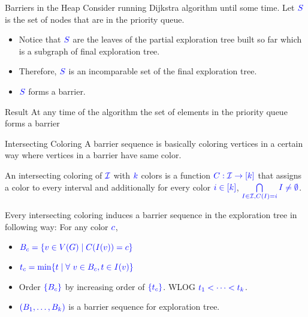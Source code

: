 \documentclass[10pt]{beamer}
\begin{document}
\begin{frame}{Barriers in the Heap}
	Consider running Dijkstra algorithm until some time. Let $\mathcolor{blue}{S}$ is the set of nodes that are in the priority queue.\pause
	\begin{itemize}
		\item Notice that $\mathcolor{blue}{S}$ are the leaves of the partial exploration tree built so far which is a subgraph of final exploration tree.\pause
		\item Therefore, $\mathcolor{blue}{S}$ is an incomparable set of the final exploration tree.
		\item $\mathcolor{blue}{S}$ forms a barrier.
	\end{itemize}\pause \vfill

	\begin{alertblock}{Result}
		At any time of the algorithm the set of elements in the priority queue forms a barrier
	\end{alertblock}
\end{frame}
\begin{frame}{Intersecting Coloring}
	A barrier sequence is basically coloring vertices in a certain way where vertices in a barrier have same color.\pause
	\begin{definition}
		An intersecting coloring of $\mathcolor{blue}{\mathcal{I}}$ with $\mathcolor{blue}{k}$ colors is a function $\mathcolor{blue}{C:\mathcal{I}\to [k]}$ that assigns a color to every interval and additionally for every color $\mathcolor{blue}{i\in[k]}$, $\mathcolor{blue}{\bigcap\limits_{I\in\mathcal{I}, C(I)=i}I\neq \emptyset}$.
	\end{definition}\pause \vfill

	Every intersecting coloring induces a barrier sequence in the exploration tree in following way: For any color $\mathcolor{blue}{c}$,\pause
	\begin{itemize}
		\item  $\mathcolor{blue}{B_c=\{v\in V(G)\mid C(I(v))=c\}}$\pause
		\item $\mathcolor{blue}{t_c=\min\{t\mid \forall\ v\in B_c, t\in I(v)\}}$\pause
		\item Order $\mathcolor{blue}{\{B_c\}}$ by increasing order of $\mathcolor{blue}{\{t_c\}}$. WLOG $\mathcolor{blue}{t_1<\cdots <t_k}$.\pause
		\item $\mathcolor{blue}{(B_1,\dots, B_k)}$ is a barrier sequence for exploration tree.
	\end{itemize}
\end{frame}
\end{document}
